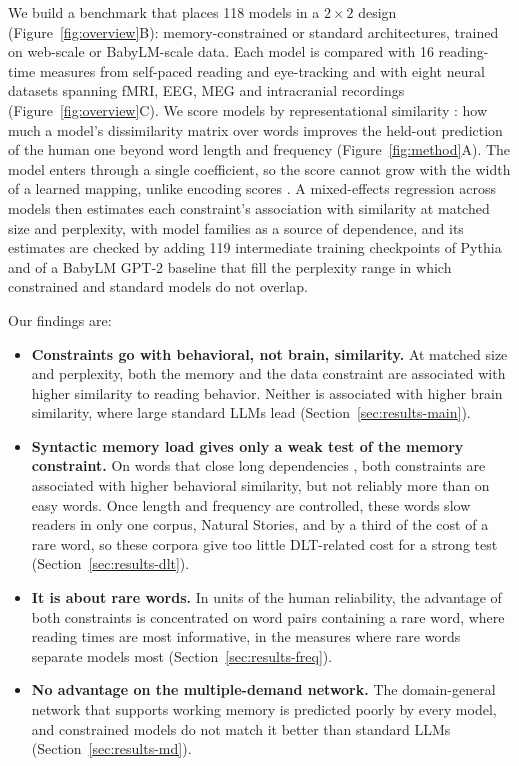 We build a benchmark that places 118 models in a $2\times2$ design (Figure~\ref{fig:overview}B): memory-constrained or standard architectures, trained on web-scale or BabyLM-scale data. Each model is compared with 16 reading-time measures from self-paced reading and eye-tracking and with eight neural datasets spanning fMRI, EEG, MEG and intracranial recordings (Figure~\ref{fig:overview}C). We score models by representational similarity \citep{kriegeskorte2008rsa}: how much a model's dissimilarity matrix over words improves the held-out prediction of the human one beyond word length and frequency (Figure~\ref{fig:method}A). The model enters through a single coefficient, so the score cannot grow with the width of a learned mapping, unlike encoding scores \citep{alkhamissi-etal-2025-language}. A mixed-effects regression across models then estimates each constraint's association with similarity at matched size and perplexity, with model families as a source of dependence, and its estimates are checked by adding 119 intermediate training checkpoints of Pythia and of a BabyLM GPT-2 baseline that fill the perplexity range in which constrained and standard models do not overlap.

Our findings are:
\begin{itemize}
    \item \textbf{Constraints go with behavioral, not brain, similarity.} At matched size and perplexity, both the memory and the data constraint are associated with higher similarity to reading behavior. Neither is associated with higher brain similarity, where large standard LLMs lead (Section~\ref{sec:results-main}).
    \item \textbf{Syntactic memory load gives only a weak test of the memory constraint.} On words that close long dependencies \citep{gibson2000dlt}, both constraints are associated with higher behavioral similarity, but not reliably more than on easy words. Once length and frequency are controlled, these words slow readers in only one corpus, Natural Stories, and by a third of the cost of a rare word, so these corpora give too little DLT-related cost for a strong test (Section~\ref{sec:results-dlt}).
    \item \textbf{It is about rare words.} In units of the human reliability, the advantage of both constraints is concentrated on word pairs containing a rare word, where reading times are most informative, in the measures where rare words separate models most (Section~\ref{sec:results-freq}).
    \item \textbf{No advantage on the multiple-demand network.} The domain-general network that supports working memory \citep{duncan2010multiple} is predicted poorly by every model, and constrained models do not match it better than standard LLMs (Section~\ref{sec:results-md}).
\end{itemize}
